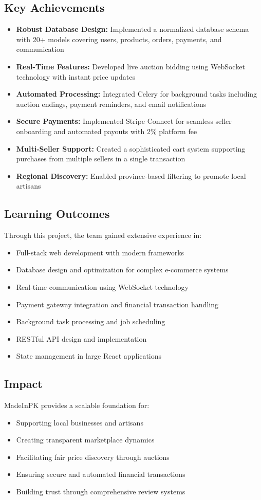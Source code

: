 \documentclass[12pt,a4paper]{article}
\begin{document}
\subsection{Key Achievements}
\begin{itemize}
    \item \textbf{Robust Database Design:} Implemented a normalized database schema with 20+ models covering users, products, orders, payments, and communication
    \item \textbf{Real-Time Features:} Developed live auction bidding using WebSocket technology with instant price updates
    \item \textbf{Automated Processing:} Integrated Celery for background tasks including auction endings, payment reminders, and email notifications
    \item \textbf{Secure Payments:} Implemented Stripe Connect for seamless seller onboarding and automated payouts with 2\% platform fee
    \item \textbf{Multi-Seller Support:} Created a sophisticated cart system supporting purchases from multiple sellers in a single transaction
    \item \textbf{Regional Discovery:} Enabled province-based filtering to promote local artisans
\end{itemize}

\subsection{Learning Outcomes}
Through this project, the team gained extensive experience in:
\begin{itemize}
    \item Full-stack web development with modern frameworks
    \item Database design and optimization for complex e-commerce systems
    \item Real-time communication using WebSocket technology
    \item Payment gateway integration and financial transaction handling
    \item Background task processing and job scheduling
    \item RESTful API design and implementation
    \item State management in large React applications
\end{itemize}

\subsection{Impact}
MadeInPK provides a scalable foundation for:
\begin{itemize}
    \item Supporting local businesses and artisans
    \item Creating transparent marketplace dynamics
    \item Facilitating fair price discovery through auctions
    \item Ensuring secure and automated financial transactions
    \item Building trust through comprehensive review systems
\end{itemize}
\end{document}
